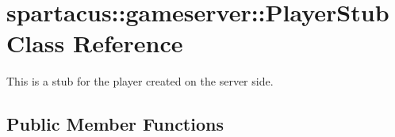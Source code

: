 \hypertarget{classspartacus_1_1gameserver_1_1PlayerStub}{
\section{\-s\-p\-a\-r\-t\-a\-c\-u\-s\-:\-:\-g\-a\-m\-e\-s\-e\-r\-v\-e\-r\-:\-:\-P\-l\-a\-y\-e\-r\-S\-t\-u\-b \-C\-l\-a\-s\-s \-R\-e\-f\-e\-r\-e\-n\-c\-e}
\label{classspartacus_1_1gameserver_1_1PlayerStub}
}


This is a stub for the player created on the server side.  


\subsection*{Public Member Functions}
